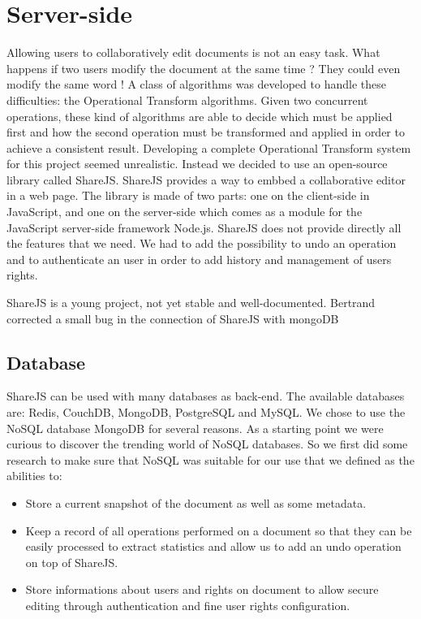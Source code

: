 \documentclass{llncs}
\begin{document}
\section{Server-side}\label{sec:Server-side}

Allowing users to collaboratively edit documents is not an easy task.
What happens if two users modify the document at the same time ?
They could even modify the same word ! A class of algorithms was developed to handle these difficulties:
the Operational Transform algorithms. Given two concurrent operations, these kind
of algorithms are able to decide which must be applied first and how the second
operation must be transformed and applied in order to achieve a consistent result.
Developing a complete Operational Transform system for this project seemed unrealistic.
Instead we decided to use an open-source library called ShareJS. 
ShareJS provides a way to embbed a collaborative editor in a web page.
The library is made of two parts: one on the client-side in JavaScript, 
and one on the server-side which comes as a module for the JavaScript server-side framework
Node.js.
ShareJS does not provide directly all the features that we need. 
We had to add the possibility to undo an operation and to authenticate an user in order to add
history and management of users rights.

ShareJS is a young project, not yet stable and well-documented.
Bertrand corrected a small bug in the connection of ShareJS with mongoDB

\subsection{Database}
ShareJS can be used with many databases as back-end. 
The available databases are: Redis, CouchDB, MongoDB, PostgreSQL and MySQL.
We chose to use the NoSQL database MongoDB for several reasons. As a starting
point we were curious to discover the trending world of NoSQL databases. So we
first did some research to make sure that NoSQL was suitable for our use that we
defined as the abilities to:

\begin{itemize}
        \item Store a current snapshot of the document as well as some metadata.
        \item Keep a record of all operations performed on a document so that
            they can be easily processed to extract statistics and allow us to
            add an undo operation on top of ShareJS.
        \item Store informations about users and rights on document to allow
            secure editing through authentication and fine user rights
            configuration.
\end{itemize}
\end{document}
